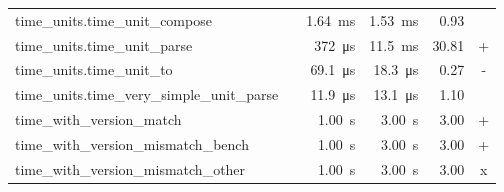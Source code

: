 \begin{tabular}{llrrrc}
time\_units.time\_unit\_compose &  & \qty{1.64}{\milli\second} & \qty{1.53}{\milli\second} & \num{0.93} &  \\
time\_units.time\_unit\_parse &  & \qty{372}{\micro\second} & \qty{11.5}{\milli\second} & \num{30.81} & + \\
time\_units.time\_unit\_to &  & \qty{69.1}{\micro\second} & \qty{18.3}{\micro\second} & \num{0.27} & - \\
time\_units.time\_very\_simple\_unit\_parse &  & \qty{11.9}{\micro\second} & \qty{13.1}{\micro\second} & \num{1.10} &  \\
time\_with\_version\_match &  & \qty{1.00}{\second} & \qty{3.00}{\second} & \num{3.00} & + \\
time\_with\_version\_mismatch\_bench &  & \qty{1.00}{\second} & \qty{3.00}{\second} & \num{3.00} & + \\
time\_with\_version\_mismatch\_other &  & \qty{1.00}{\second} & \qty{3.00}{\second} & \num{3.00} & x \\
\bottomrule
\end{tabular}
